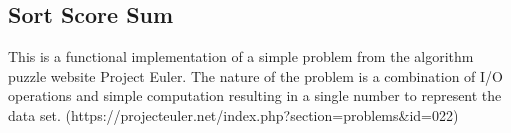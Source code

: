 \subsection{Sort Score Sum}
This is a functional implementation of a simple problem from the algorithm puzzle website Project Euler.  The nature of the problem is a combination of I/O operations and simple computation resulting in a single number to represent the data set.  (https://projecteuler.net/index.php?section=problems&id=022)



